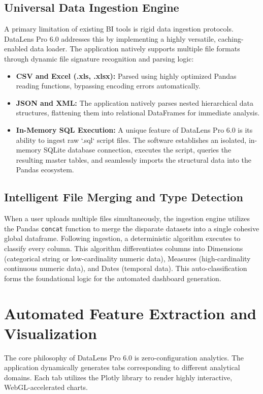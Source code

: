 \documentclass[12pt, a4paper]{article}
\begin{document}
\subsection{Universal Data Ingestion Engine}
A primary limitation of existing BI tools is rigid data ingestion protocols. DataLens Pro 6.0 addresses this by implementing a highly versatile, caching-enabled data loader. The application natively supports multiple file formats through dynamic file signature recognition and parsing logic:
\begin{itemize}
    \item \textbf{CSV and Excel (.xls, .xlsx):} Parsed using highly optimized Pandas reading functions, bypassing encoding errors automatically.
    \item \textbf{JSON and XML:} The application natively parses nested hierarchical data structures, flattening them into relational DataFrames for immediate analysis.
    \item \textbf{In-Memory SQL Execution:} A unique feature of DataLens Pro 6.0 is its ability to ingest raw `.sql` script files. The software establishes an isolated, in-memory SQLite database connection, executes the script, queries the resulting master tables, and seamlessly imports the structural data into the Pandas ecosystem.
\end{itemize}
\subsection{Intelligent File Merging and Type Detection}
When a user uploads multiple files simultaneously, the ingestion engine utilizes the Pandas \texttt{concat} function to merge the disparate datasets into a single cohesive global dataframe. Following ingestion, a deterministic algorithm executes to classify every column. This algorithm differentiates columns into Dimensions (categorical string or low-cardinality numeric data), Measures (high-cardinality continuous numeric data), and Dates (temporal data). This auto-classification forms the foundational logic for the automated dashboard generation.
\section{Automated Feature Extraction and Visualization}
The core philosophy of DataLens Pro 6.0 is zero-configuration analytics. The application dynamically generates tabs corresponding to different analytical domains. Each tab utilizes the Plotly library to render highly interactive, WebGL-accelerated charts.
\end{document}
